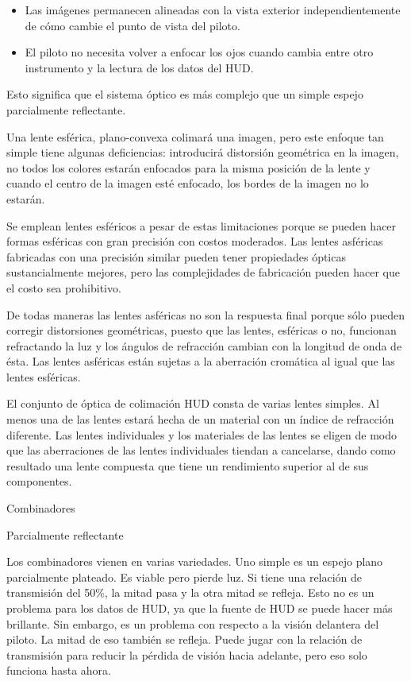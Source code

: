 \begin{itemize}
\item Las imágenes permanecen alineadas con la vista exterior independientemente de cómo cambie el punto de vista del piloto.

\item El piloto no necesita volver a enfocar los ojos cuando cambia entre otro instrumento y la lectura de los datos del HUD. 
\end{itemize}

Esto significa que el sistema óptico es más complejo que un simple espejo parcialmente reflectante.

Una lente esférica, plano-convexa colimará una imagen, pero este enfoque tan simple tiene algunas deficiencias: introducirá distorsión geométrica en la imagen, no todos los colores estarán enfocados para la misma posición de la lente y cuando el centro de la imagen esté enfocado, los bordes de la imagen no lo estarán.

Se emplean lentes esféricos a pesar de estas limitaciones porque se pueden hacer formas esféricas con gran precisión con costos moderados. Las lentes asféricas fabricadas con una precisión similar pueden tener propiedades ópticas sustancialmente mejores, pero las complejidades de fabricación pueden hacer que el costo sea prohibitivo.

De todas maneras las lentes asféricas no son la respuesta final porque sólo pueden corregir distorsiones geométricas, puesto que las lentes, esféricas o no, funcionan refractando la luz y los ángulos de refracción cambian con la longitud de onda de ésta. Las lentes asféricas están sujetas a la aberración cromática al igual que las lentes esféricas.

El conjunto de óptica de colimación HUD consta de varias lentes simples. Al menos una de las lentes estará hecha de un material con un índice de refracción diferente. Las lentes individuales y los materiales de las lentes se eligen de modo que las aberraciones de las lentes individuales tiendan a cancelarse, dando como resultado una lente compuesta que tiene un rendimiento superior al de sus componentes.

Combinadores

Parcialmente reflectante

Los combinadores vienen en varias variedades. Uno simple es un espejo plano parcialmente plateado. Es viable pero pierde luz. Si tiene una relación de transmisión del 50\%, la mitad pasa y la otra mitad se refleja. Esto no es un problema para los datos de HUD, ya que la fuente de HUD se puede hacer más brillante. Sin embargo, es un problema con respecto a la visión delantera del piloto. La mitad de eso también se refleja. Puede jugar con la relación de transmisión para reducir la pérdida de visión hacia adelante, pero eso solo funciona hasta ahora.

